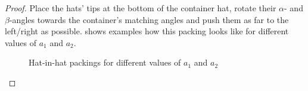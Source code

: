 \documentclass[a4paper,style=print,bibliography=totoc,nexus,lnum,extramargin]{tubsbook}
\begin{document}
\begin{proof}
    Place the hats' tips at the bottom of the container hat, rotate their $\alpha$- and $\beta$-angles towards the container's matching angles and push them as far to the left/right as possible.  shows examples how this packing looks like for different values of $a_1$ and $a_2$.

    \begin{figure}

        \vspace{2mm}


        \vspace{2mm}


        \vspace{2mm}


        \caption{Hat-in-hat packings for different values of $a_1$ and $a_2$}
        \label{fig:hats-in-hat}
    \end{figure}


\end{proof}
\end{document}
